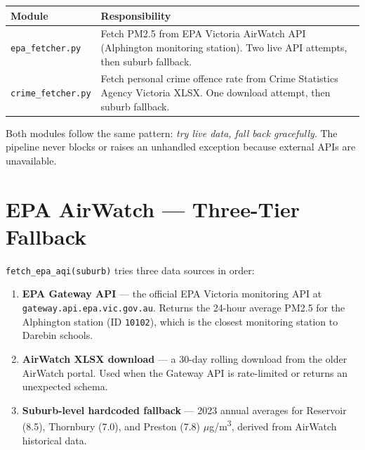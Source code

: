 \documentclass[11pt,a4paper,openany]{book}
\begin{document}
\begin{center}
\begin{tabular}{lL{9cm}}
\toprule
Module & Responsibility \\
\midrule
\texttt{epa\_fetcher.py} & Fetch PM2.5 from EPA Victoria AirWatch API
  (Alphington monitoring station). Two live API attempts, then suburb fallback. \\
\texttt{crime\_fetcher.py} & Fetch personal crime offence rate from
  Crime Statistics Agency Victoria XLSX. One download attempt, then suburb fallback. \\
\bottomrule
\end{tabular}
\end{center}

Both modules follow the same pattern: \emph{try live data, fall back gracefully}.
The pipeline never blocks or raises an unhandled exception because external APIs
are unavailable.

\section{EPA AirWatch --- Three-Tier Fallback}

\texttt{fetch\_epa\_aqi(suburb)} tries three data sources in order:

\begin{enumerate}
  \item \textbf{EPA Gateway API} --- the official EPA Victoria monitoring API at
        \texttt{gateway.api.epa.vic.gov.au}.  Returns the 24-hour average PM2.5
        for the Alphington station (ID \texttt{10102}), which is the closest
        monitoring station to Darebin schools.
  \item \textbf{AirWatch XLSX download} --- a 30-day rolling download from the
        older AirWatch portal.  Used when the Gateway API is rate-limited or
        returns an unexpected schema.
  \item \textbf{Suburb-level hardcoded fallback} --- 2023 annual averages for
        Reservoir (8.5), Thornbury (7.0), and Preston (7.8) $\mu$g/m\textsuperscript{3},
        derived from AirWatch historical data.
\end{enumerate}
\end{document}
